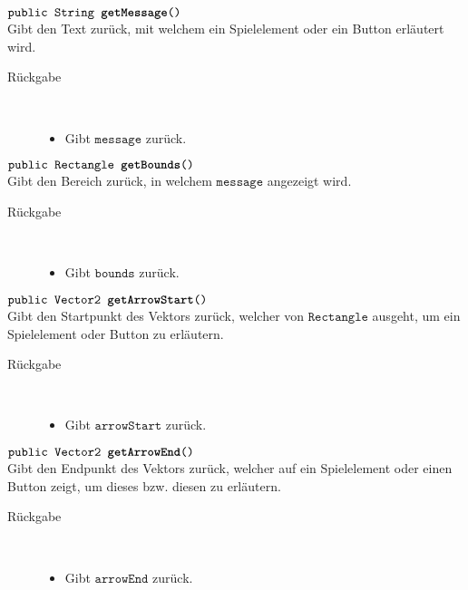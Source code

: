 \begin{description}
		\item $\texttt{public String \textbf{getMessage}()}$ \\ Gibt den Text zurück, mit welchem ein Spielelement oder ein Button erläutert wird.
		\begin{description}
			\item[Rückgabe] \hfill \\
			\vspace{-.8cm}
			\begin{itemize}
				\item Gibt $\texttt{message}$ zurück.
			\end{itemize}
			\end{description}

		\item $\texttt{public Rectangle \textbf{getBounds}()}$ \\ Gibt den Bereich zurück, in welchem $\texttt{message}$ angezeigt wird.
		\begin{description}
			\item[Rückgabe] \hfill \\
			\vspace{-.8cm}
			\begin{itemize}
				\item Gibt $\texttt{bounds}$ zurück.
			\end{itemize}
			\end{description}
			
		\item $\texttt{public Vector2 \textbf{getArrowStart}()}$ \\ Gibt den Startpunkt des Vektors zurück, welcher von $\texttt{Rectangle}$ ausgeht, um ein Spielelement oder Button zu erläutern.
		\begin{description}
			\item[Rückgabe] \hfill \\
			\vspace{-.8cm}
			\begin{itemize}
				\item Gibt $\texttt{arrowStart}$ zurück.
			\end{itemize}
			\end{description}

		\item $\texttt{public Vector2 \textbf{getArrowEnd}()}$ \\ Gibt den Endpunkt des Vektors zurück, welcher auf ein Spielelement oder einen Button zeigt, um dieses bzw. diesen zu erläutern.
		\begin{description}
			\item[Rückgabe] \hfill \\
			\vspace{-.8cm}
			\begin{itemize}
				\item Gibt $\texttt{arrowEnd}$ zurück.
			\end{itemize}
			\end{description}

		
	\end{description}

